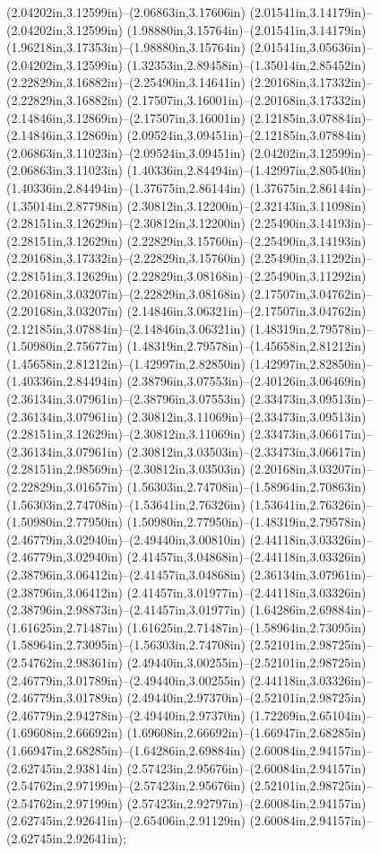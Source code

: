 (2.04202in,3.12599in)--(2.06863in,3.17606in) (2.01541in,3.14179in)--(2.04202in,3.12599in) (1.98880in,3.15764in)--(2.01541in,3.14179in) (1.96218in,3.17353in)--(1.98880in,3.15764in) (2.01541in,3.05636in)--(2.04202in,3.12599in) (1.32353in,2.89458in)--(1.35014in,2.85452in) (2.22829in,3.16882in)--(2.25490in,3.14641in) (2.20168in,3.17332in)--(2.22829in,3.16882in) (2.17507in,3.16001in)--(2.20168in,3.17332in) (2.14846in,3.12869in)--(2.17507in,3.16001in) (2.12185in,3.07884in)--(2.14846in,3.12869in) (2.09524in,3.09451in)--(2.12185in,3.07884in) (2.06863in,3.11023in)--(2.09524in,3.09451in) (2.04202in,3.12599in)--(2.06863in,3.11023in) (1.40336in,2.84494in)--(1.42997in,2.80540in) (1.40336in,2.84494in)--(1.37675in,2.86144in) (1.37675in,2.86144in)--(1.35014in,2.87798in) (2.30812in,3.12200in)--(2.32143in,3.11098in) (2.28151in,3.12629in)--(2.30812in,3.12200in) (2.25490in,3.14193in)--(2.28151in,3.12629in) (2.22829in,3.15760in)--(2.25490in,3.14193in) (2.20168in,3.17332in)--(2.22829in,3.15760in) (2.25490in,3.11292in)--(2.28151in,3.12629in) (2.22829in,3.08168in)--(2.25490in,3.11292in) (2.20168in,3.03207in)--(2.22829in,3.08168in) (2.17507in,3.04762in)--(2.20168in,3.03207in) (2.14846in,3.06321in)--(2.17507in,3.04762in) (2.12185in,3.07884in)--(2.14846in,3.06321in) (1.48319in,2.79578in)--(1.50980in,2.75677in) (1.48319in,2.79578in)--(1.45658in,2.81212in) (1.45658in,2.81212in)--(1.42997in,2.82850in) (1.42997in,2.82850in)--(1.40336in,2.84494in) (2.38796in,3.07553in)--(2.40126in,3.06469in) (2.36134in,3.07961in)--(2.38796in,3.07553in) (2.33473in,3.09513in)--(2.36134in,3.07961in) (2.30812in,3.11069in)--(2.33473in,3.09513in) (2.28151in,3.12629in)--(2.30812in,3.11069in) (2.33473in,3.06617in)--(2.36134in,3.07961in) (2.30812in,3.03503in)--(2.33473in,3.06617in) (2.28151in,2.98569in)--(2.30812in,3.03503in) (2.20168in,3.03207in)--(2.22829in,3.01657in) (1.56303in,2.74708in)--(1.58964in,2.70863in) (1.56303in,2.74708in)--(1.53641in,2.76326in) (1.53641in,2.76326in)--(1.50980in,2.77950in) (1.50980in,2.77950in)--(1.48319in,2.79578in) (2.46779in,3.02940in)--(2.49440in,3.00810in) (2.44118in,3.03326in)--(2.46779in,3.02940in) (2.41457in,3.04868in)--(2.44118in,3.03326in) (2.38796in,3.06412in)--(2.41457in,3.04868in) (2.36134in,3.07961in)--(2.38796in,3.06412in) (2.41457in,3.01977in)--(2.44118in,3.03326in) (2.38796in,2.98873in)--(2.41457in,3.01977in) (1.64286in,2.69884in)--(1.61625in,2.71487in) (1.61625in,2.71487in)--(1.58964in,2.73095in) (1.58964in,2.73095in)--(1.56303in,2.74708in) (2.52101in,2.98725in)--(2.54762in,2.98361in) (2.49440in,3.00255in)--(2.52101in,2.98725in) (2.46779in,3.01789in)--(2.49440in,3.00255in) (2.44118in,3.03326in)--(2.46779in,3.01789in) (2.49440in,2.97370in)--(2.52101in,2.98725in) (2.46779in,2.94278in)--(2.49440in,2.97370in) (1.72269in,2.65104in)--(1.69608in,2.66692in) (1.69608in,2.66692in)--(1.66947in,2.68285in) (1.66947in,2.68285in)--(1.64286in,2.69884in) (2.60084in,2.94157in)--(2.62745in,2.93814in) (2.57423in,2.95676in)--(2.60084in,2.94157in) (2.54762in,2.97199in)--(2.57423in,2.95676in) (2.52101in,2.98725in)--(2.54762in,2.97199in) (2.57423in,2.92797in)--(2.60084in,2.94157in) (2.62745in,2.92641in)--(2.65406in,2.91129in) (2.60084in,2.94157in)--(2.62745in,2.92641in);

